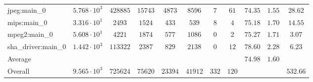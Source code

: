 \begin{tabular}{|l|c|c|c|c|c|c|c|c|c|c|}
jpeg:main\_0            & $ 5.768 \cdot 10^{3} $ & $ 428885 $ & $ 15743 $ & $ 4873  $ & $ 8596  $ & $ 7   $ & $ 61  $ & $ 74.35       $ & $ 1.55    $ & $ 28.62   $ \\
mips:main\_0            & $ 3.316 \cdot 10^{1} $ & $ 2493   $ & $ 1524  $ & $ 433   $ & $ 539   $ & $ 8   $ & $ 4   $ & $ 75.18       $ & $ 1.70    $ & $ 14.55   $ \\
mpeg2:main\_0           & $ 5.608 \cdot 10^{1} $ & $ 4221   $ & $ 1874  $ & $ 577   $ & $ 1086  $ & $ 0   $ & $ 2   $ & $ 75.27       $ & $ 1.71    $ & $ 3.07    $ \\
sha\_driver:main\_0     & $ 1.442 \cdot 10^{3} $ & $ 113322 $ & $ 2387  $ & $ 829   $ & $ 2138  $ & $ 0   $ & $ 12  $ & $ 78.60       $ & $ 2.28    $ & $ 6.23    $ \\
\hline
Average                 & $                    $ & $        $ & $       $ & $       $ & $       $ & $     $ & $     $ & $ 74.98       $ & $ 1.60    $ & $         $ \\
\hline
Overall                 & $ 9.565 \cdot 10^{3} $ & $ 725624 $ & $ 75620 $ & $ 23394 $ & $ 41912 $ & $ 332 $ & $ 120 $ & $             $ & $         $ & $ 532.66  $ \\
\hline
\end{tabular}
